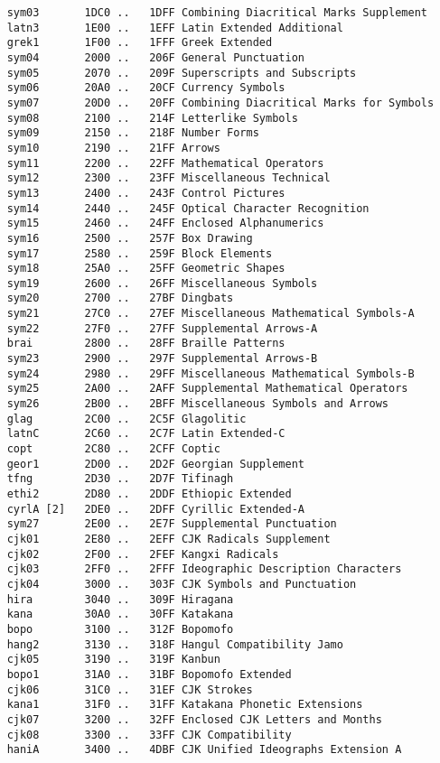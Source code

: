 \documentclass[uplatex,dvipdfmx,a4paper]{jsarticle}
\begin{document}
\begin{verbatim}
    sym03       1DC0 ..   1DFF Combining Diacritical Marks Supplement
    latn3       1E00 ..   1EFF Latin Extended Additional
    grek1       1F00 ..   1FFF Greek Extended
    sym04       2000 ..   206F General Punctuation
    sym05       2070 ..   209F Superscripts and Subscripts
    sym06       20A0 ..   20CF Currency Symbols
    sym07       20D0 ..   20FF Combining Diacritical Marks for Symbols
    sym08       2100 ..   214F Letterlike Symbols
    sym09       2150 ..   218F Number Forms
    sym10       2190 ..   21FF Arrows
    sym11       2200 ..   22FF Mathematical Operators
    sym12       2300 ..   23FF Miscellaneous Technical
    sym13       2400 ..   243F Control Pictures
    sym14       2440 ..   245F Optical Character Recognition
    sym15       2460 ..   24FF Enclosed Alphanumerics
    sym16       2500 ..   257F Box Drawing
    sym17       2580 ..   259F Block Elements
    sym18       25A0 ..   25FF Geometric Shapes
    sym19       2600 ..   26FF Miscellaneous Symbols
    sym20       2700 ..   27BF Dingbats
    sym21       27C0 ..   27EF Miscellaneous Mathematical Symbols-A
    sym22       27F0 ..   27FF Supplemental Arrows-A
    brai        2800 ..   28FF Braille Patterns
    sym23       2900 ..   297F Supplemental Arrows-B
    sym24       2980 ..   29FF Miscellaneous Mathematical Symbols-B
    sym25       2A00 ..   2AFF Supplemental Mathematical Operators
    sym26       2B00 ..   2BFF Miscellaneous Symbols and Arrows
    glag        2C00 ..   2C5F Glagolitic
    latnC       2C60 ..   2C7F Latin Extended-C
    copt        2C80 ..   2CFF Coptic
    geor1       2D00 ..   2D2F Georgian Supplement
    tfng        2D30 ..   2D7F Tifinagh
    ethi2       2D80 ..   2DDF Ethiopic Extended
    cyrlA [2]   2DE0 ..   2DFF Cyrillic Extended-A
    sym27       2E00 ..   2E7F Supplemental Punctuation
    cjk01       2E80 ..   2EFF CJK Radicals Supplement
    cjk02       2F00 ..   2FEF Kangxi Radicals
    cjk03       2FF0 ..   2FFF Ideographic Description Characters
    cjk04       3000 ..   303F CJK Symbols and Punctuation
    hira        3040 ..   309F Hiragana
    kana        30A0 ..   30FF Katakana
    bopo        3100 ..   312F Bopomofo
    hang2       3130 ..   318F Hangul Compatibility Jamo
    cjk05       3190 ..   319F Kanbun
    bopo1       31A0 ..   31BF Bopomofo Extended
    cjk06       31C0 ..   31EF CJK Strokes
    kana1       31F0 ..   31FF Katakana Phonetic Extensions
    cjk07       3200 ..   32FF Enclosed CJK Letters and Months
    cjk08       3300 ..   33FF CJK Compatibility
    haniA       3400 ..   4DBF CJK Unified Ideographs Extension A

\end{verbatim}
\end{document}
